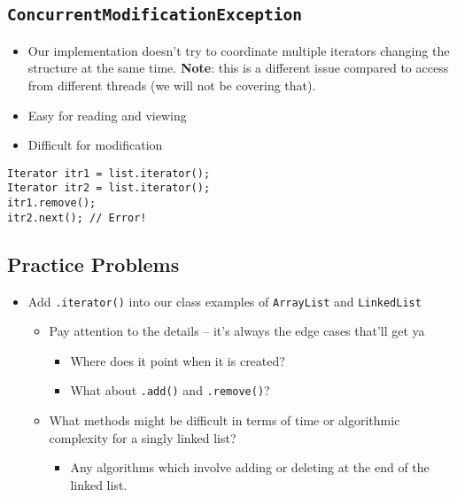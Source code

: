 \documentclass[10pt]{article}
\begin{document}
\subsection*{\texttt{ConcurrentModificationException}}
\begin{itemize}
    \item Our implementation doesn't try to coordinate multiple iterators changing the structure at the same time. \textbf{Note}: this is a different issue compared to access from different threads (we will not be covering that).
    \item Easy for reading and viewing
    \item Difficult for modification
\end{itemize}
\begin{verbatim}
Iterator itr1 = list.iterator();
Iterator itr2 = list.iterator();
itr1.remove();
itr2.next(); // Error!
\end{verbatim}


\subsection*{Practice Problems}
\begin{itemize}
    \item Add \texttt{.iterator()} into our class examples of \texttt{ArrayList} and \texttt{LinkedList}
    \begin{itemize}
        \item Pay attention to the details -- it's always the edge cases that'll get ya
        \begin{itemize}
            \item Where does it point when it is created?
            \item What about \texttt{.add()} and \texttt{.remove()}?
        \end{itemize}
        \item What methods might be difficult in terms of time or algorithmic complexity for a singly linked list?
        \begin{itemize}
            \item Any algorithms which involve adding or deleting at the end of the linked list.
        \end{itemize}
    \end{itemize}
\end{itemize}
\end{document}
